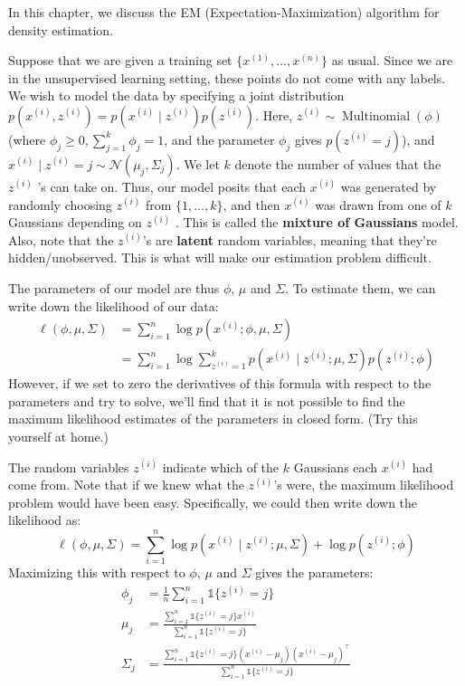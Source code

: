 \vspace{1cm}
\begin{fullwidth}
\label{cha:gmm}
\end{fullwidth}
In this chapter, we discuss the EM (Expectation-Maximization) algorithm %
for density estimation.

Suppose that we are given a training set $\{x^{(1)},\ldots,x^{(n)}\}$ as usual. Since
we are in the unsupervised learning setting, these points do not come with
any labels.
We wish to model the data by specifying a joint distribution $p(x^{(i)} ,z^{(i)} ) =
p(x^{(i)} \mid z^{(i)} )p(z^{(i)} )$. Here, $z^{(i)} \sim \operatorname{Multinomial}(\phi)$ (where $\phi_j \ge 0,
\sum^k_{j=1} \phi_j = 1$,
and the parameter $\phi_j$ gives $p(z^{(i)} = j)$), and $x^{(i)} \mid z^{(i)} = j \sim \mathcal N(\mu_j ,\Sigma_j )$. We
let $k$ denote the number of values that the $z^{(i)}$ 's can take on. Thus, our
model posits that each $x^{(i)}$ was generated by randomly choosing $z^{(i)}$ from
$\{1,\ldots,k\}$, and then $x^{(i)}$ was drawn from one of $k$ Gaussians depending on
$z^{(i)}$ . This is called the \textbf{mixture of Gaussians} model. Also, note that the
$z^{(i)}$'s are \textbf{latent} random variables, meaning that they're hidden/unobserved.
This is what will make our estimation problem difficult.

The parameters of our model are thus $\phi$, $\mu$ and $\Sigma$. To estimate them, we
can write down the likelihood of our data:
\begin{align*}
    \ell(\phi,\mu,\Sigma) &= \sum^n_{i=1} \log p(x^{(i)} ;\phi,\mu,\Sigma)\\
        &= \sum^n_{i=1} \log \sum^k_{z^{(i)} = 1} p(x^{(i)} \mid z^{(i)} ;\mu,\Sigma)p(z^{(i)} ;\phi)
\end{align*}
However, if we set to zero the derivatives of this formula with respect to
the parameters and try to solve, we'll find that it is not possible to find the
maximum likelihood estimates of the parameters in closed form. (Try this
yourself at home.)

The random variables $z^{(i)}$ indicate which of the $k$ Gaussians each $x^{(i)}$
had come from. Note that if we knew what the $z^{(i)}$'s were, the maximum
likelihood problem would have been easy. Specifically, we could then write
down the likelihood as:
\begin{equation*}
    \ell(\phi,\mu,\Sigma) = \sum_{i=1}^n \log p(x^{(i)} \mid z^{(i)} ;\mu,\Sigma) + \log p(z^{(i)} ;\phi)
\end{equation*}
Maximizing this with respect to $\phi$, $\mu$ and $\Sigma$ gives the parameters:
\begin{align*}
    \phi_j &= \frac{1}{n} \sum_{i=1}^n \mathbb{1}\{z^{(i)} = j\}\\
    \mu_j &= \frac{\sum^n_{i=1} \mathbb{1}\{z^{(i)} = j\}x^{(i)}}{\sum^n_{i=1} \mathbb{1}\{z^{(i)} = j\}}\\
    \Sigma_j &= \frac{\sum^n_{i=1} \mathbb{1}\{z^{(i)} = j\}(x^{(i)} - \mu_j)(x^{(i)} - \mu_j)^\top}{\sum^n_{i=1} \mathbb{1}\{z^{(i)} = j\}}
\end{align*}

